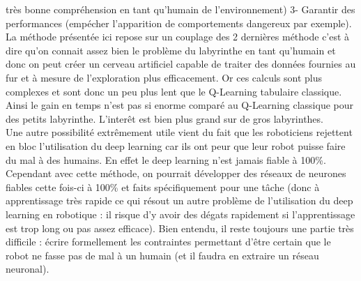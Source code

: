 \documentclass[10pt]{article}
\begin{document}
très bonne compréhension en tant qu'humain de l'environnement) 3- Garantir des performances (empécher l'apparition de comportements dangereux par exemple).\\
La méthode présentée ici repose sur un couplage des 2 dernières méthode c'est à dire qu'on connait assez bien le problème du labyrinthe en tant qu'humain et donc on peut créer un cerveau artificiel capable de traiter des données fournies au fur et à mesure de l'exploration plus efficacement. Or ces calculs sont plus complexes et sont donc un peu plus lent que le Q-Learning tabulaire classique. Ainsi le gain en temps n'est pas si enorme comparé au Q-Learning classique pour des petits labyrinthe. L'interêt est bien plus grand sur de gros labyrinthes.\\
Une autre possibilité extrêmement utile vient du fait que les roboticiens rejettent en bloc l'utilisation du deep learning car ils ont peur que leur robot puisse faire du mal à des humains. En effet le deep learning n'est jamais fiable à 100\%. Cependant avec cette méthode, on pourrait développer des réseaux de neurones fiables cette fois-ci à 100\% et faits spécifiquement pour une tâche (donc à apprentissage très rapide ce qui résout un autre problème de l'utilisation du deep learning en robotique : il risque d'y avoir des dégats rapidement si l'apprentissage est trop long ou pas assez efficace). Bien entendu, il reste toujours une partie très difficile : écrire formellement les contraintes permettant d'être certain que le robot ne fasse pas de mal à un humain (et il faudra en extraire un réseau neuronal). 
\end{document}
